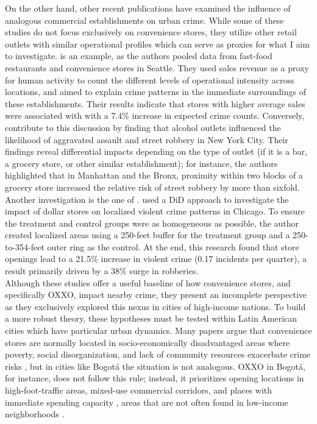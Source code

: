 \documentclass[12pt]{article}
\begin{document}
On the other hand, other recent publications have examined the influence of analogous commercial establishments on urban crime. While some of these studies do not focus exclusively on convenience stores, they utilize other retail outlets with similar operational profiles which can serve as proxies for what I aim to investigate. \textcite{askey2018fast} is an example, as the authors pooled data from fast-food restaurants and convenience stores in Seattle. They used sales revenue as a proxy for human activity to count the different levels of operational intensity across locations, and aimed to explain crime patterns in the immediate surroundings of these establishments. Their results indicate that stores with higher average sales were associated with with a 7.4\% increase in expected crime counts. Conversely, \textcite{feng2019aggravating} contribute to this discussion by finding that alcohol outlets influenced the likelihood of aggravated assault and street robbery in New York City. Their findings reveal differential impacts depending on the type of outlet (if it is a bar, a grocery store, or other similar establishment); for instance, the authors highlighted that in Manhattan and the Bronx, proximity within two blocks of a grocery store increased the relative risk of street robbery by more than sixfold.\\ 

Another investigation is the one of \textcite{shin2024dollar}. \textcite{shin2024dollar} used a DiD approach to investigate the impact of dollar stores on localized violent crime patterns in Chicago. To ensure the treatment and control groups were as homogeneous as possible, the author created localized areas using a 250-feet buffer for the treatment group and a 250-to-354-feet outer ring as the control. At the end, this research found that store openings lead to a 21.5\% increase in violent crime (0.17 incidents per quarter), a result primarily driven by a 38\% surge in robberies.\\

Although these studies offer a useful baseline of how convenience stores, and specifically OXXO, impact nearby crime, they present an incomplete perspective as they exclusively explored this nexus in cities of high-income nations. To build a more robust theory, these hypotheses must be tested within Latin American cities which have particular urban dynamics. Many papers argue that convenience stores are normally located in socio-economically disadvantaged areas where poverty, social disorganization, and lack of community resources exacerbate crime risks \parencite{shin2024dollar, Dugato2026}, but in cities like Bogotá the situation is not analogous. OXXO in Bogotá, for instance, does not follow this rule; instead, it prioritizes opening locations in high-foot-traffic areas, mixed-use commercial corridors, and places with immediate spending capacity \parencite{marcos2022}, areas that are not often found in low-income neighborhoods \parencite{ccb2026distribucion}.\\
\end{document}
